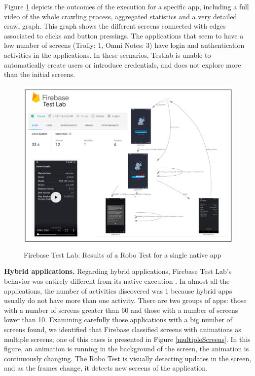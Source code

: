 Figure \ref{firebase} depicts the outcomes of the execution for a specific app, including a full video of the whole crawling process, aggregated statistics and a very detailed crawl graph. This graph shows the different screens connected with edges associated to clicks and button pressings. The applications that seem to have a low number of screens (\eg Trolly: 1, Omni Notes: 3) have login and authentication activities in the applications. In these scenarios, Testlab is unable to automatically create users or introduce credentials, and does not explore more than the initial screens. 

\begin{figure}[t]
	\centering
	\includegraphics[width=1\textwidth]{img/firebase.pdf}
	\caption{Firebase Test Lab: Results of a Robo Test for a single native app}
	
	\label{firebase}
\end{figure} 

\textbf{Hybrid applications.} Regarding hybrid applications, Firebase Test Lab's behavior was entirely different from its native execution . In almost all the applications, the number of activities discovered was 1 because hybrid apps usually do not have more than one activity. There are two groups of apps: those with a number of screens greater than 60 and those with a number of screens lower than 10. Examining carefully those applications with a big number of screens found, we identified that Firebase classified screens with animations as multiple screens; one of this cases is presented in Figure \ref{multipleScreens}.  In this figure, an animation is running in the background of the screen, the animation is continuously changing. The Robo Test is visually detecting updates in the screen, and as the frames change, it detects new screens of the application.

